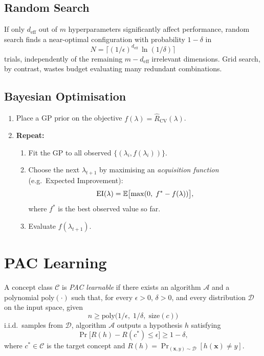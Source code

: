 \subsection{Random Search}

\begin{theorem}
If only $d_{\text{eff}}$ out of $m$ hyperparameters significantly affect performance, random search finds a near-optimal configuration with probability $1-\delta$ in
\[
  N = \lceil (1/\epsilon)^{d_{\text{eff}}}\,\ln(1/\delta) \rceil
\]
trials, independently of the remaining $m-d_{\text{eff}}$ irrelevant dimensions. Grid search, by contrast, wastes budget evaluating many redundant combinations.
\end{theorem}

\subsection{Bayesian Optimisation}

\begin{algorithme}[title=\textbf{Bayesian Hyperparameter Optimisation}]
\begin{enumerate}
  \item Place a GP prior on the objective $f(\lambda)=\hat R_{\text{CV}}(\lambda)$.
  \item \textbf{Repeat:}
    \begin{enumerate}
      \item Fit the GP to all observed $\{(\lambda_i, f(\lambda_i))\}$.
      \item Choose the next $\lambda_{t+1}$ by maximising an \emph{acquisition function} (e.g.\ Expected Improvement):
        \[
          \text{EI}(\lambda) = \mathbb{E}\bigl[\max(0,\; f^* - f(\lambda))\bigr],
        \]
        where $f^*$ is the best observed value so far.
      \item Evaluate $f(\lambda_{t+1})$.
    \end{enumerate}
\end{enumerate}
\end{algorithme}

\section{PAC Learning}

\begin{definition}
A concept class $\mathcal{C}$ is \emph{PAC learnable} if there exists an algorithm $\mathcal{A}$ and a polynomial $\text{poly}(\cdot)$ such that, for every $\epsilon>0$, $\delta>0$, and every distribution $\mathcal{D}$ on the input space, given
\[
  n \geq \text{poly}\!\bigl(1/\epsilon,\;1/\delta,\;\text{size}(c)\bigr)
\]
i.i.d.\ samples from $\mathcal{D}$, algorithm $\mathcal{A}$ outputs a hypothesis $h$ satisfying
\[
  \Pr\bigl[R(h) - R(c^*) \leq \epsilon\bigr] \geq 1 - \delta,
\]
where $c^*\in\mathcal{C}$ is the target concept and $R(h)=\Pr_{(\bm{x},y)\sim\mathcal{D}}[h(\bm{x})\neq y]$.
\end{definition}

